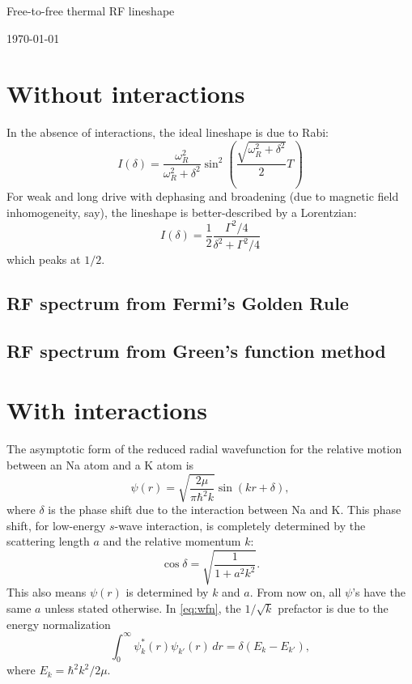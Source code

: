 \documentclass{article}
\theoremstyle{definition}
\newcommand{\f}[2]{\frac{#1}{#2}}
\newcommand{\lp}{\left(}
\newcommand{\rp}{\right)}
\begin{document}
\begin{center}
	\Large{Free-to-free thermal RF lineshape}
\end{center}	

\begin{center}
	\today
\end{center}

\section{Without interactions}

In the absence of interactions, the ideal lineshape is due to Rabi:
\begin{equation}\label{eq:Rabi}
I(\delta) = \f{\omega_R^2}{\omega_R^2 + \delta^2} \sin^2 \lp  \f{\sqrt{\omega_R^2 + \delta^2}}{2} T \rp
\end{equation}
For weak and long drive with dephasing and broadening (due to magnetic field inhomogeneity, say), the lineshape is better-described by a Lorentzian:
\begin{equation}\label{eq:no-interaction-lineshape}
I(\delta) = \f{1}{2}\f{\Gamma^2/4}{\delta^2 + \Gamma^2/4}
\end{equation}
which peaks at $1/2$. 

\subsection{RF spectrum from Fermi's Golden Rule}


\subsection{RF spectrum from Green's function method}



\section{With interactions}

The asymptotic form of the reduced radial wavefunction for the relative motion between an Na atom and a K atom is 
\begin{equation}\label{eq:wfn}
\psi(r) = \sqrt{\frac{2\mu}{\pi \hbar^2 k}} \sin(kr + \delta),
\end{equation}
where $\delta$ is the phase shift due to the interaction between Na and K. This phase shift, for low-energy $s$-wave interaction, is completely determined by the scattering length $a$ and the relative momentum $k$:
\begin{equation} \label{eq:phase_shift}
\cos \delta = \sqrt{\f{1}{1 + a^2 k^2}}.
\end{equation}
This also means $\psi(r)$ is determined by $k$ and $a$. From now on, all $\psi$'s have the same $a$ unless stated otherwise. In \eqref{eq:wfn}, the $1/\sqrt{k}$ prefactor is due to the energy normalization
\begin{equation}\label{eq:norm}
\int_0^\infty \psi_k^*(r) \psi_{k'}(r) \,dr = \delta(E_k - E_{k'}),
\end{equation}
where $E_k = \hbar^2 k^2 / 2\mu$.\\
\end{document}
